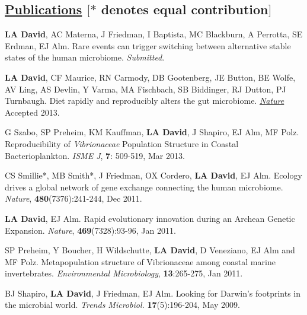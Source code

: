 \documentclass[overlapped,line,11pt]{res}
\begin{document}
\begin{resume}
\section{\underline{\sc Publications} \hspace{2.95in} \sc $[\ast$ denotes equal
      contribution$]$}

\vspace{.25in}

\begin{revnumerate}[11]

\item {\textbf{LA David}, AC Materna, J Friedman, I Baptista, MC
  Blackburn, A Perrotta, SE Erdman, EJ Alm.  Rare events can
  trigger switching between alternative stable states of the human
  microbiome.  \emph{Submitted}.}

\item {\textbf{LA David}, CF Maurice, RN Carmody, DB Gootenberg, JE
  Button, BE Wolfe, AV Ling, AS Devlin, Y Varma, MA Fischbach, SB
  Biddinger, RJ Dutton, PJ Turnbaugh.  Diet rapidly and reproducibly
  alters the gut microbiome.  \emph{\underline{Nature}} Accepted 2013.}

\item {G Szabo, SP Preheim, KM Kauffman, \textbf{LA David}, J Shapiro,
  EJ Alm, MF Polz.  Reproducibility of \emph{Vibrionaceae} Population
  Structure in Coastal Bacterioplankton.  \emph{ISME J}, \textbf{7}:
  509-519, Mar 2013.}

\item {CS Smillie*, MB Smith*, J Friedman, OX Cordero, \textbf{LA
    David}, EJ Alm.  Ecology drives a global network of gene exchange
  connecting the human microbiome.  \emph{Nature},
  \textbf{480}(7376):241-244, Dec 2011.}

\item {\textbf{LA David}, EJ Alm.  Rapid evolutionary innovation during
  an Archean Genetic Expansion.  \emph{Nature},
  \textbf{469}(7328):93-96, Jan 2011.}

\vspace*{1mm}
\item {SP Preheim, Y Boucher, H Wildschutte, \textbf{LA David},
  D Veneziano, EJ Alm and MF Polz.  Metapopulation
  structure of Vibrionaceae among coastal marine
  invertebrates. \emph{Environmental Microbiology}, \textbf{13}:265-275, Jan 2011.} 

\vspace*{1mm}
\item {BJ Shapiro, \textbf{LA David}, J Friedman, EJ Alm. Looking for
Darwin's footprints in the microbial world.  {\em Trends Microbiol.}
\textbf{17}(5):196-204, May 2009.}


\end{revnumerate}
\end{resume}
\end{document}
